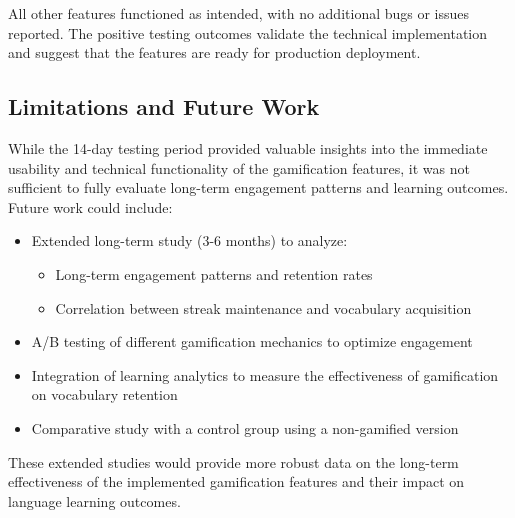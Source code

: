 All other features functioned as intended, with no additional bugs or issues reported. The positive testing outcomes validate the technical implementation and suggest that the features are ready for production deployment.

\subsection{Limitations and Future Work}
While the 14-day testing period provided valuable insights into the immediate usability and technical functionality of the gamification features, it was not sufficient to fully evaluate long-term engagement patterns and learning outcomes. Future work could include:
\begin{itemize}
    \item Extended long-term study (3-6 months) to analyze:
    \begin{itemize}
        \item Long-term engagement patterns and retention rates
        \item Correlation between streak maintenance and vocabulary acquisition
    \end{itemize}
    \item A/B testing of different gamification mechanics to optimize engagement
    \item Integration of learning analytics to measure the effectiveness of gamification on vocabulary retention
    \item Comparative study with a control group using a non-gamified version
\end{itemize}
These extended studies would provide more robust data on the long-term effectiveness of the implemented gamification features and their impact on language learning outcomes.
